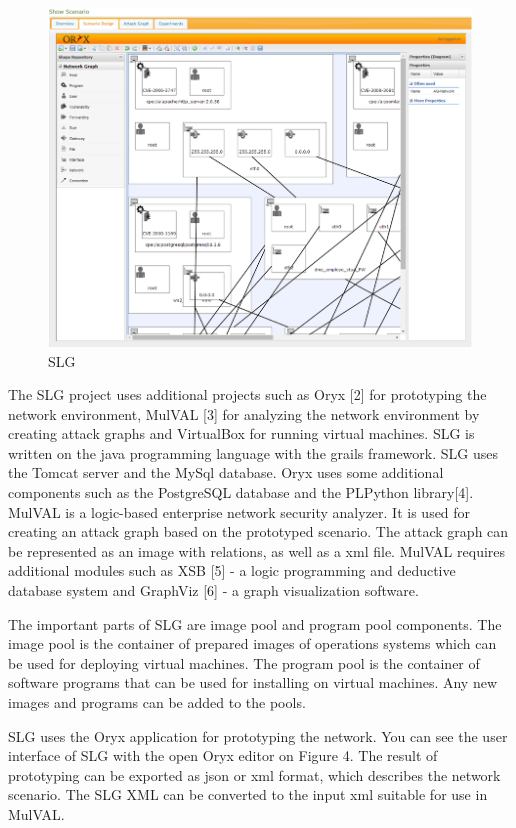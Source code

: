 \begin{figure}[ht!]
\centering
\includegraphics[width=\textwidth]{slg.png}
\caption{SLG}
\label{overflow}
\end{figure} 

The SLG project uses additional projects such as Oryx [2] for prototyping the network environment, MulVAL [3] for analyzing the network environment by creating attack graphs and VirtualBox for running virtual machines. SLG is written on the java programming language with the grails framework. SLG uses the Tomcat server and the MySql database. Oryx uses some additional components such as the PostgreSQL database and the PLPython library[4]. MulVAL is a logic-based enterprise network security analyzer. It is used for creating an attack graph based on the prototyped scenario. The attack graph can be represented as an image with relations, as well as a xml file. MulVAL requires additional modules such as XSB [5] - a logic programming and deductive database system and GraphViz [6] - a graph visualization software. 

The important parts of SLG are image pool and program pool components. The image pool is the container of prepared images of operations systems which can be used for deploying virtual machines. The program pool is the container of software programs that can be used for installing on virtual machines. Any new images and programs can be added to the pools.

SLG uses the Oryx application for prototyping the network. You can see the user interface of SLG with the open Oryx editor on Figure 4. The result of prototyping can be exported as json or xml format, which describes the network scenario. The SLG XML can be converted to the input xml suitable for use in MulVAL. 

